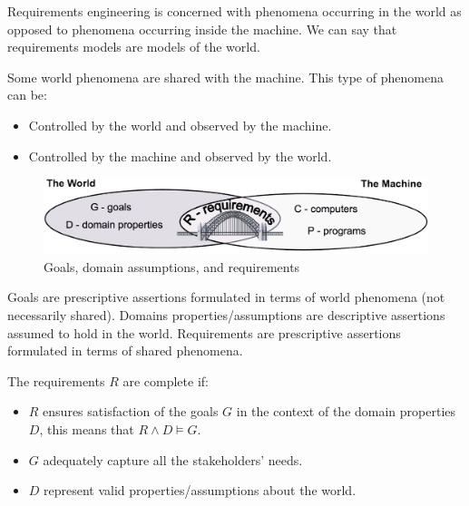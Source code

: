 \documentclass[12pt, a4paper]{report}
\newtheorem[style=M,bodystyle=\normalfont]{theorem}{Theorem}
\newtheorem[style=M,bodystyle=\normalfont]{corollary}{Corollary}
\newtheorem[style=M,bodystyle=\normalfont]{lemma}{Lemma}
\newtheorem[style=M,bodystyle=\normalfont]{definition}{Definition}
\begin{document}
    Requirements engineering is concerned with phenomena occurring in the world as opposed to phenomena occurring inside the machine. We can say that requirements models are models 
    of the world. 
     
    Some world phenomena are shared with the machine. This type of phenomena can be: 
    \begin{itemize}
        \item Controlled by the world and observed by the machine.
        \item Controlled by the machine and observed by the world.
    \end{itemize}
    \begin{figure}[H]
        \centering
        \includegraphics[width=0.75\linewidth]{images/worldmachine.png}
        \caption{Goals, domain assumptions, and requirements}
    \end{figure}
    Goals are prescriptive assertions formulated in terms of world phenomena (not necessarily shared). Domains properties/assumptions are descriptive assertions assumed to hold in 
    the world. Requirements are prescriptive assertions formulated in terms of shared phenomena. 
      
    The requirements $R$ are complete if: 
    \begin{itemize}
        \item $R$ ensures satisfaction of the goals $G$ in the context of the domain properties $D$, this means that $R\land D \models G$.
        \item $G$ adequately capture all the stakeholders' needs.
        \item $D$ represent valid properties/assumptions about the world.
    \end{itemize}
\end{document}
